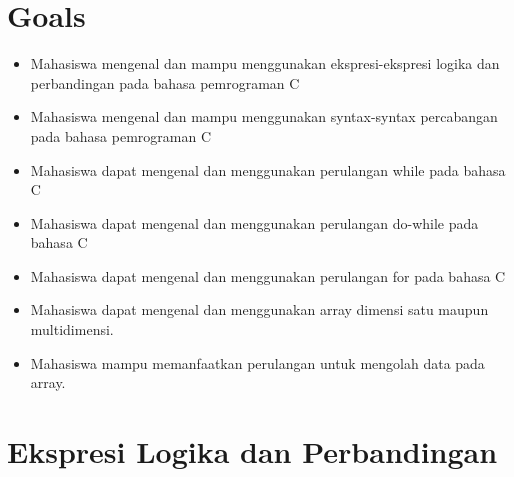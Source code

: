 \section{Goals}
\begin{itemize}[label=$\bullet$, itemsep=-1pt, leftmargin=*]
    \item Mahasiswa mengenal dan mampu menggunakan ekspresi-ekspresi logika dan perbandingan pada bahasa pemrograman C
    \item Mahasiswa mengenal dan mampu menggunakan syntax-syntax percabangan pada bahasa pemrograman C
    \item Mahasiswa dapat mengenal dan menggunakan perulangan while pada bahasa C
    \item Mahasiswa dapat mengenal dan menggunakan perulangan do-while pada bahasa C
    \item Mahasiswa dapat mengenal dan menggunakan perulangan for pada bahasa C
    \item Mahasiswa dapat mengenal dan menggunakan  array dimensi satu maupun multidimensi.
    \item Mahasiswa mampu memanfaatkan perulangan untuk mengolah data pada array.
\end{itemize}
\section{Ekspresi Logika dan Perbandingan}
